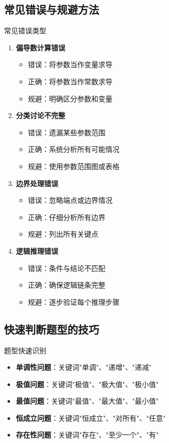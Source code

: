 \documentclass[a4paper,11pt]{ctexart}
\theoremstyle{definition}
\theoremstyle{remark}
\begin{document}
\subsection{常见错误与规避方法}

\begin{warningbox}{常见错误类型}
\begin{enumerate}
    \item \textbf{偏导数计算错误}
    \begin{itemize}
        \item 错误：将参数当作变量求导
        \item 正确：将参数当作常数求导
        \item 规避：明确区分参数和变量
    \end{itemize}
    \item \textbf{分类讨论不完整}
    \begin{itemize}
        \item 错误：遗漏某些参数范围
        \item 正确：系统分析所有可能情况
        \item 规避：使用参数范围图或表格
    \end{itemize}
    \item \textbf{边界处理错误}
    \begin{itemize}
        \item 错误：忽略端点或边界情况
        \item 正确：仔细分析所有边界
        \item 规避：列出所有关键点
    \end{itemize}
    \item \textbf{逻辑推理错误}
    \begin{itemize}
        \item 错误：条件与结论不匹配
        \item 正确：确保逻辑链条完整
        \item 规避：逐步验证每个推理步骤
    \end{itemize}
\end{enumerate}
\end{warningbox}

\subsection{快速判断题型的技巧}

\begin{conceptbox}{题型快速识别}
\begin{itemize}
    \item \textbf{单调性问题}：关键词"单调"、"递增"、"递减"
    \item \textbf{极值问题}：关键词"极值"、"极大值"、"极小值"
    \item \textbf{最值问题}：关键词"最值"、"最大值"、"最小值"
    \item \textbf{恒成立问题}：关键词"恒成立"、"对所有"、"任意"
    \item \textbf{存在性问题}：关键词"存在"、"至少一个"、"有"
\end{itemize}
\end{conceptbox}
\end{document}
